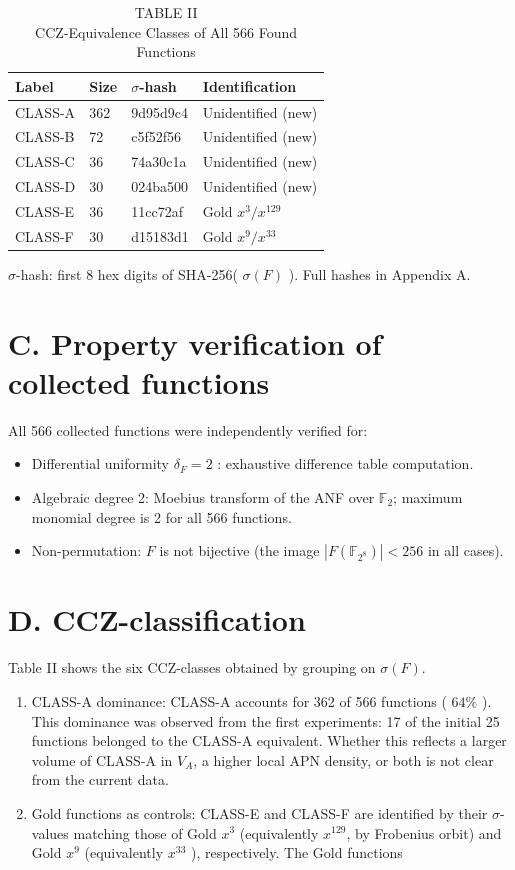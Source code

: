 \documentclass[10pt]{article}
\begin{document}
\begin{table}[h]
\begin{center}
\captionsetup{labelformat=empty}
\caption{TABLE II\\
CCZ-Equivalence Classes of All 566 Found Functions}
\begin{tabular}{|l|l|l|l|}
\hline
Label & Size & $\sigma$-hash & Identification \\
\hline
CLASS-A & 362 & 9d95d9c4 & Unidentified (new) \\
\hline
CLASS-B & 72 & c5f52f56 & Unidentified (new) \\
\hline
CLASS-C & 36 & 74a30c1a & Unidentified (new) \\
\hline
CLASS-D & 30 & 024ba500 & Unidentified (new) \\
\hline
CLASS-E & 36 & 11cc72af & Gold $x^{3} / x^{129}$ \\
\hline
CLASS-F & 30 & d15183d1 & Gold $x^{9} / x^{33}$ \\
\hline
\end{tabular}
\end{center}
\end{table}

$\sigma$-hash: first 8 hex digits of SHA-256( $\sigma(F)$ ). Full hashes in Appendix A.

\section*{C. Property verification of collected functions}
All 566 collected functions were independently verified for:

\begin{itemize}
  \item Differential uniformity $\delta_{F}=2$ : exhaustive difference table computation.
  \item Algebraic degree 2: Moebius transform of the ANF over $\mathbb{F}_{2}$; maximum monomial degree is 2 for all 566 functions.
  \item Non-permutation: $F$ is not bijective (the image $\left|F\left(\mathbb{F}_{2^{8}}\right)\right|<256$ in all cases).
\end{itemize}

\section*{D. CCZ-classification}
Table II shows the six CCZ-classes obtained by grouping on $\sigma(F)$.

\begin{enumerate}
  \item CLASS-A dominance: CLASS-A accounts for 362 of 566 functions ( $64 \%$ ). This dominance was observed from the first experiments: 17 of the initial 25 functions belonged to the CLASS-A equivalent. Whether this reflects a larger volume of CLASS-A in $V_{A}$, a higher local APN density, or both is not clear from the current data.
  \item Gold functions as controls: CLASS-E and CLASS-F are identified by their $\sigma$-values matching those of Gold $x^{3}$ (equivalently $x^{129}$, by Frobenius orbit) and Gold $x^{9}$ (equivalently $x^{33}$ ), respectively. The Gold functions
\end{enumerate}
\end{document}
